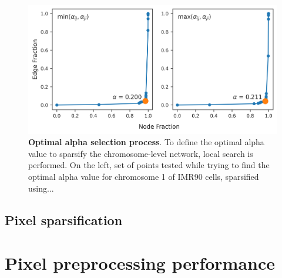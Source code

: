 \begin{figure}[h]
  \centering 
  \includegraphics[width=1\textwidth]{alpha_tables.png}
  \caption{\textbf{Optimal alpha selection process}. To define the optimal alpha value to sparsify the chromosome-level network, local search is performed. On the left, set of points tested while trying to find the optimal alpha value for chromosome 1 of IMR90 cells, sparsified using... }
  \label{fig:alphas}
\end{figure}

\subsection{Pixel sparsification}


\section{Pixel preprocessing performance}

